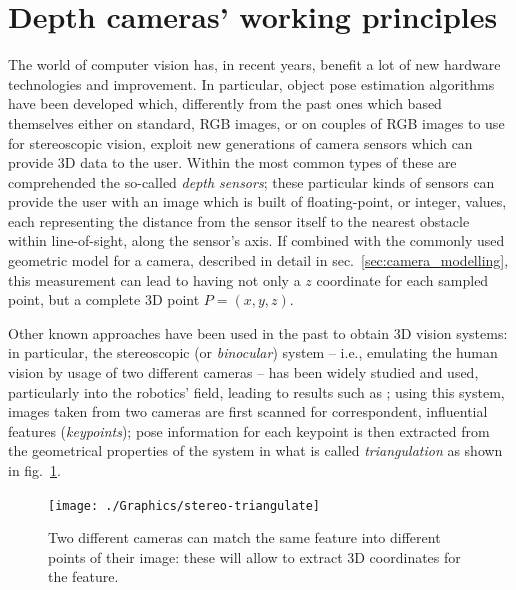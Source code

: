 \section{Depth cameras' working principles}

The world of computer vision has, in recent years, benefit a lot of new hardware
technologies and improvement. In particular, object pose estimation algorithms
have been developed which, differently from the past ones which based themselves
either on standard, RGB images, or on couples of RGB images to use for
stereoscopic vision, exploit new generations of camera sensors which can provide
3D data to the user. Within the most common types of these are comprehended the
so-called \emph{depth sensors}; these particular kinds of sensors can provide
the user with an image which is built of floating-point, or integer, values,
each representing the distance from the sensor itself to the nearest obstacle
within line-of-sight, along the sensor's axis. If combined with the commonly
used geometric model for a camera, described in detail in sec.~\ref{sec:camera_modelling}, this measurement can lead to having not only a $z$
coordinate for each sampled point, but a complete 3D point $P=(x,y,z)$.

Other known approaches have been used in the past to obtain 3D vision systems:
in particular, the stereoscopic (or \emph{binocular}) system -- i.e., emulating the human vision by usage
of two different cameras -- has been widely studied and used, particularly into
the robotics' field, leading to
results such as \cite{stereo-vision-robot}; using this system, images taken
from two cameras are first scanned for correspondent, influential features
(\emph{keypoints}); pose information for each keypoint is then extracted from
the geometrical properties of the system in what is called \emph{triangulation}
as shown in fig.~\ref{fig:stereo-triangulate}.

\begin{figure}[htbp]
\centering
\texttt{[image: ./Graphics/stereo-triangulate]}
\caption{Two different cameras can match the same feature into different points
of their image: these will allow to extract 3D coordinates for the feature.\label{fig:stereo-triangulate}}
\end{figure}


